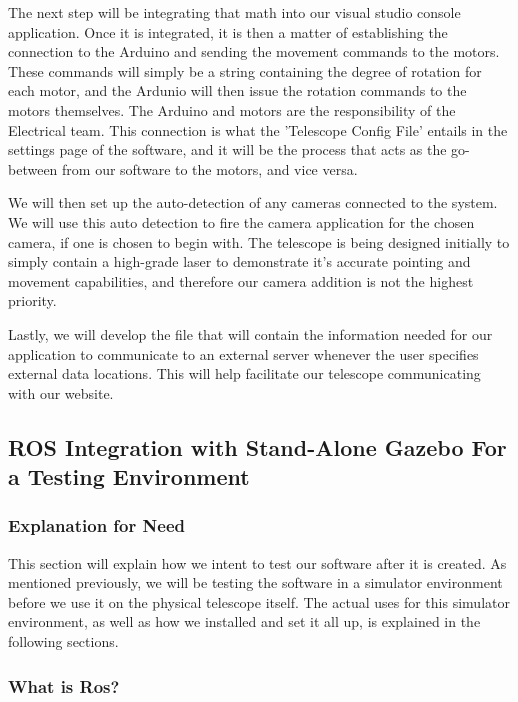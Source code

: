 \documentclass[12pt]{report}
\begin{document}
The next step will be integrating that math into our visual studio console application. Once it is integrated, it is then a matter of establishing the connection to the Arduino and sending the movement commands to the motors. These commands will simply be a string containing the degree of rotation for each motor, and the Ardunio will then issue the rotation commands to the motors themselves. The Arduino and motors are the responsibility of the Electrical team. This connection is what the 'Telescope Config File' entails in the settings page of the software, and it will be the process that acts as the go-between from our software to the motors, and vice versa. 

We will then set up the auto-detection of any cameras connected to the system. We will use this auto detection to fire the camera application for the chosen camera, if one is chosen to begin with. The telescope is being designed initially to simply contain a high-grade laser to demonstrate it's accurate pointing and movement capabilities, and therefore our camera addition is not the highest priority. 

Lastly, we will develop the file that will contain the information needed for our application to communicate to an external server whenever the user specifies external data locations. This will help facilitate our telescope communicating with our website. 

\subsection*{ROS Integration with Stand-Alone Gazebo For a Testing Environment}

\subsubsection*{Explanation for Need}

This section will explain how we intent to test our software after it is created. As mentioned previously, we will be testing the software in a simulator environment before we use it on the physical telescope itself. The actual uses for this simulator environment, as well as how we installed and set it all up, is explained in the following sections.

\newpage

\subsubsection*{What is Ros?}
\end{document}
